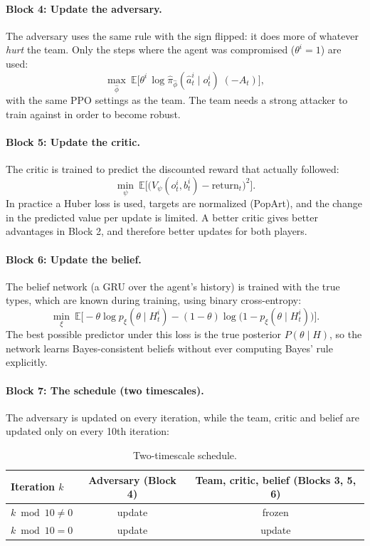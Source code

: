 \documentclass[11pt]{article}
\newcommand{\E}{\mathbb{E}}
\begin{document}
\paragraph{Block 4: Update the adversary.}
The adversary uses the same rule with the sign flipped: it does more of whatever
\emph{hurt} the team. Only the steps where the agent was compromised ($\theta^i = 1$) are
used:
\[
  \max_{\hat\phi} \ \E\big[\theta^i\, \log \hat\pi_{\hat\phi}(\hat a^i_t \mid o^i_t)\; (-A_t)\big],
\]
with the same PPO settings as the team. The team needs a strong attacker to train against
in order to become robust.

\paragraph{Block 5: Update the critic.}
The critic is trained to predict the discounted reward that actually followed:
\[
  \min_\psi \ \E\Big[\big(V_\psi(o^i_t, b^i_t) - \text{return}_t\big)^2\Big].
\]
In practice a Huber loss is used, targets are normalized (PopArt), and the change in the
predicted value per update is limited. A better critic gives better advantages in Block 2,
and therefore better updates for both players.

\paragraph{Block 6: Update the belief.}
The belief network (a GRU over the agent's history) is trained with the true types, which
are known during training, using binary cross-entropy:
\[
  \min_\xi \ \E\Big[-\theta \log p_\xi(\theta \mid H^i_t)
    - (1-\theta)\log\big(1 - p_\xi(\theta \mid H^i_t)\big)\Big].
\]
The best possible predictor under this loss is the true posterior $P(\theta \mid H)$, so the
network learns Bayes-consistent beliefs without ever computing Bayes' rule explicitly.

\paragraph{Block 7: The schedule (two timescales).}
The adversary is updated on every iteration, while the team, critic and belief are updated
only on every 10th iteration:

\begin{table}[h]
  \centering
  \begin{tabular}{@{}lcc@{}}
    \toprule
    Iteration $k$ & Adversary (Block 4) & Team, critic, belief (Blocks 3, 5, 6) \\
    \midrule
    $k \bmod 10 \neq 0$ & update & frozen \\
    $k \bmod 10 = 0$ & update & update \\
    \bottomrule
  \end{tabular}
  \caption{Two-timescale schedule.}
\end{table}
\end{document}
